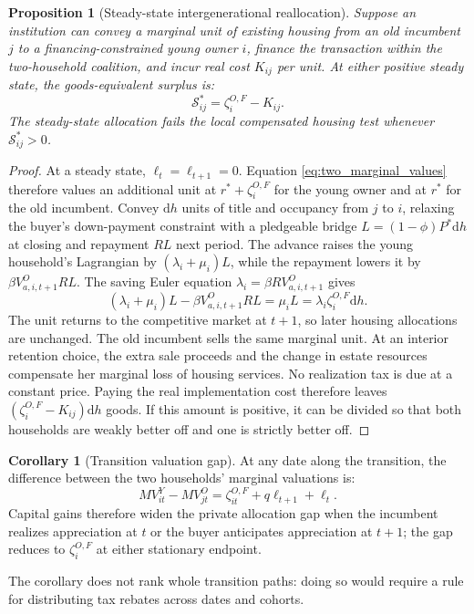 \documentclass[10pt]{article}
\newtheorem{proposition}{Proposition}
\theoremstyle{definition}
\newtheorem{corollary}{Corollary}
\newcommand{\dd}{\mathrm d}
\begin{document}
\begin{proposition}[Steady-state intergenerational reallocation]
Suppose an institution can convey a marginal unit of existing housing from an
old incumbent $j$ to a financing-constrained young owner $i$, finance the
transaction within the two-household coalition, and incur real cost $K_{ij}$
per unit. At either positive steady state, the goods-equivalent surplus is:
\begin{equation}
 \mathcal S_{ij}^*=\zeta_i^{O,F}-K_{ij}.
 \label{eq:ss_reallocation_surplus}
\end{equation}
The steady-state allocation fails the local compensated housing test whenever
$\mathcal S_{ij}^*>0$.
\end{proposition}

\begin{proof}
At a steady state, $\ell_t=\ell_{t+1}=0$. Equation
\eqref{eq:two_marginal_values} therefore values an additional unit at
$r^*+\zeta_i^{O,F}$ for the young owner and at $r^*$ for the old incumbent.
Convey $\dd h$ units of title and occupancy from $j$ to $i$, relaxing the
buyer's down-payment constraint with a pledgeable bridge
$L=(1-\phi)P^*\dd h$ at closing and repayment $RL$ next period. The advance
raises the young household's Lagrangian by $(\lambda_i+\mu_i)L$, while the
repayment lowers it by $\beta V_{a,i,t+1}^ORL$. The saving Euler equation
$\lambda_i=\beta RV_{a,i,t+1}^O$ gives
\begin{equation*}
 (\lambda_i+\mu_i)L-\beta V_{a,i,t+1}^ORL
 =\mu_iL=\lambda_i\zeta_i^{O,F}\dd h.
\end{equation*}
The unit returns to
the competitive market at $t+1$, so later housing allocations are unchanged.
The old incumbent sells the same marginal unit. At an interior retention
choice, the extra sale proceeds and the change in estate resources compensate
her marginal loss of housing services. No realization tax is due at a constant
price. Paying the real implementation cost therefore leaves
$(\zeta_i^{O,F}-K_{ij})\dd h$ goods. If this amount is positive, it can be
divided so that both households are weakly better off and one is strictly
better off.
\end{proof}

\begin{corollary}[Transition valuation gap]
At any date along the transition, the difference between the two households'
marginal valuations is:
\begin{equation}
 MV_{it}^Y-MV_{jt}^O
 =\zeta_{it}^{O,F}+q\ell_{t+1}+\ell_t.
 \label{eq:transition_valuation_gap}
\end{equation}
Capital gains therefore widen the private allocation gap when the incumbent
realizes appreciation at $t$ or the buyer anticipates appreciation at $t+1$;
the gap reduces to $\zeta_i^{O,F}$ at either stationary endpoint.
\end{corollary}
The corollary does not rank whole transition paths: doing so would require a
rule for distributing tax rebates across dates and cohorts.
\end{document}
